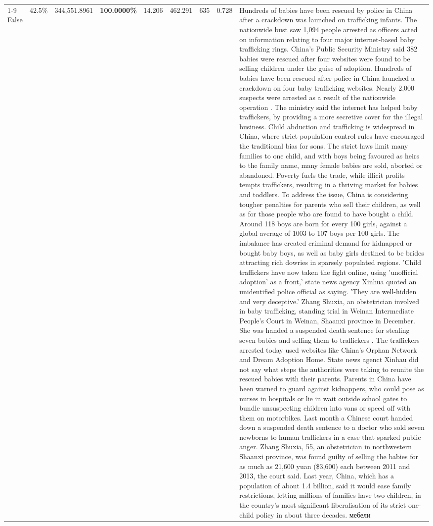 \begin{table}[H]
\begin{tabular}{lllrlllll}
\cline{1-9}
False & 42.5\% & 344,551.8961 & \bfseries \color{red} 100.0000\% & 14.206 & 462.291 & 635 & 0.728 & Hundreds of babies have been rescued by police in China after a crackdown was launched on trafficking infants. The nationwide bust saw 1,094 people arrested as officers acted on information relating to four major internet-based baby trafficking rings. China's Public Security Ministry said 382 babies were rescued after four websites were found to be selling children under the guise of adoption. Hundreds of babies have been rescued after police in China launched a crackdown on four baby trafficking websites. Nearly 2,000 suspects were arrested as a result of the nationwide operation . The ministry said the internet has helped baby traffickers, by providing a more secretive cover for the illegal business. Child abduction and trafficking is widespread in China, where strict population control rules have encouraged the traditional bias for sons. The strict laws limit many families to one child, and with boys being favoured as heirs to the family name, many female babies are sold, aborted or abandoned. Poverty fuels the trade, while illicit profits tempts traffickers, resulting in a thriving market for babies and toddlers. To address the issue, China is considering tougher penalties for parents who sell their children, as well as for those people who are found to have bought a child. Around 118 boys are born for every 100 girls, against a global average of 1003 to 107 boys per 100 girls. The imbalance has created criminal demand for kidnapped or bought baby boys, as well as baby girls destined to be brides attracting rich dowries in sparsely populated regions. 'Child traffickers have now taken the fight online, using 'unofficial adoption' as a front,' state news agency Xinhua quoted an unidentified police official as saying. 'They are well-hidden and very deceptive.' Zhang Shuxia, an obstetrician involved in baby trafficking, standing trial in Weinan Intermediate People's Court in Weinan, Shaanxi province in December. She was handed a suspended death sentence for stealing seven babies and selling them to traffickers . The traffickers arrested today used websites like China's Orphan Network and Dream Adoption Home. State news agenct Xinhau did not say what steps the authorities were taking to reunite the rescued babies with their parents. Parents in China have been warned to guard against kidnappers, who could pose as nurses in hospitals or lie in wait outside school gates to bundle unsuspecting children into vans or speed off with them on motorbikes. Last month a Chinese court handed down a suspended death sentence to a doctor who sold seven newborns to human traffickers in a case that sparked public anger. Zhang Shuxia, 55, an obstetrician in northwestern Shaanxi province, was found guilty of selling the babies for as much as 21,600 yuan (\$3,600) each between 2011 and 2013, the court said. Last year, China, which has a population of about 1.4 billion, said it would ease family restrictions, letting millions of families have two children, in the country's most significant liberalisation of its strict one-child policy in about three decades. мебели \\

\end{tabular}
\end{table}
